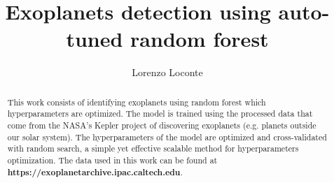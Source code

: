 \documentclass[11pt, a4paper]{article}
\title{Exoplanets detection using auto-tuned random forest}
\author{Lorenzo Loconte}
\begin{document}
\maketitle
\begin{abstract}
  This work consists of identifying exoplanets using random forest which hyperparameters are optimized.
  The model is trained using the processed data that come from the NASA's Kepler project of discovering exoplanets (e.g. planets outside our solar system).
  The hyperparameters of the model are optimized and cross-validated with random search, a simple yet effective scalable method for hyperparameters optimization.
  The data used in this work can be found at \textbf{https://exoplanetarchive.ipac.caltech.edu}.
\end{abstract}
\vspace{5mm}
\end{document}
